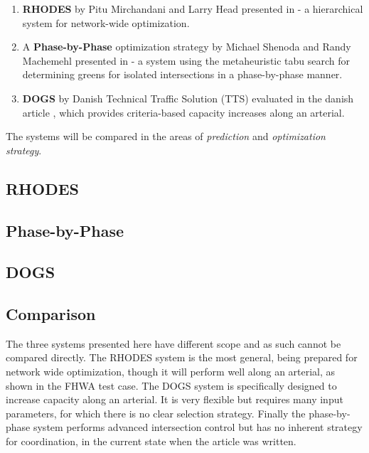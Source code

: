\begin{enumerate}
\item \textbf{RHODES} by Pitu Mirchandani and Larry Head presented in
\cite{44} - a hierarchical system for network-wide optimization.

\item A \textbf{Phase-by-Phase} optimization strategy by Michael
Shenoda and Randy Machemehl presented in \cite{1} - a system using the
metaheuristic tabu search for determining greens for isolated
intersections in a phase-by-phase manner.

\item \textbf{DOGS} by Danish Technical Traffic Solution (TTS)
evaluated in the danish article \cite{dogs}, which provides
criteria-based capacity increases along an arterial.

\end{enumerate}

The systems will be compared in the areas of \textit{prediction} and
\textit{optimization strategy}.

\subsection{RHODES}


\subsection{Phase-by-Phase}


\subsection{DOGS}


\subsection{Comparison}

The three systems presented here have different scope and as such
cannot be compared directly. The RHODES system is the most general,
being prepared for network wide optimization, though it will perform
well along an arterial, as shown in the FHWA test case. The DOGS
system is specifically designed to increase capacity along an
arterial. It is very flexible but requires many input parameters, for
which there is no clear selection strategy. Finally the phase-by-phase
system performs advanced intersection control but has no inherent
strategy for coordination, in the current state when the article was
written.

